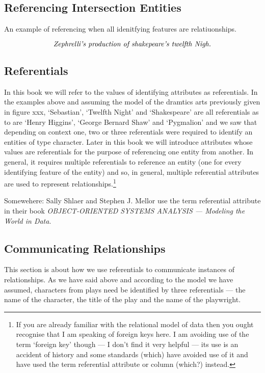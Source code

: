  \subsection{Referencing Intersection Entities}
 An example of referencing when all idenitfying features are relatiuonships.

\begin{equation*}
\text{\textit{Zephrelli's production of shakepeare's twelfth Nigh.}}
\end{equation*} 

\subsection{Referentials}
\mynote
In this book we will refer to the values of identifying attributes as referentials.
In the examples above 
and assuming  the model of the dramtics arts previously given in figure xxx,
 `Sebastian', `Twelfth Night' and `Shakespeare' are all referentials 
 as to are `Henry Higgins', `George Bernard Shaw'  and `Pygmalion' and
we saw that depending on context one, two or three referentials were required
 to identify an entities of type character.
\mynote 
Later in this book we will introduce attributes whose values are referentials 
for the purpose of referencing one entity from another.
In general, it requires multiple referentials to reference an entity (one for every identifying
feature of the entity) and so, in general, multiple referential attributes are used to represent relationships.\footnote{If you are already familiar with the relational model of data then you ought recognise that I am speaking of foreign keys here. 
I am avoiding use of the term `foreign key' though --- I don't find it very helpful --- its use is an accident of history and some standards (which) have avoided use of it and have used the term referential attribute or column (which?) instead. } 

\mynote Somewehere: Sally Shlaer and Stephen J. Mellor use the term referential attribute
in their book \textit{OBJECT-ORIENTED SYSTEMS ANALYSIS --- Modeling the World in Data}.

\subsection{Communicating Relationships}

\mynote This section is about how we use referentials to communicate instances of relationships.
As we have said above and according to the model we have assumed,
  characters from plays need be identified by three referentials
 --- the name of the character, the title of the play and the name of the playwright.


